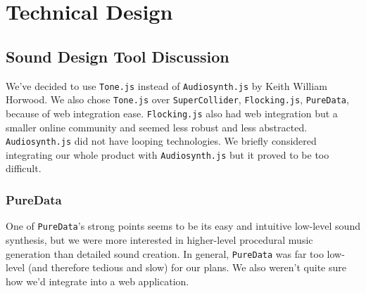 \documentclass[12pt,a4paper]{article}
\newcommand{\lightcode}[1]{\colorbox{light-gray}{\texttt{#1}}}
\begin{document}
\pagebreak
\section{Technical Design}

\subsection{Sound Design Tool Discussion}
We've decided to use \lightcode{Tone.js} instead of \lightcode{Audiosynth.js} by Keith William Horwood. We also chose \lightcode{Tone.js} over \lightcode{SuperCollider}, \lightcode{Flocking.js}, \lightcode{PureData}, because of web integration ease. \lightcode{Flocking.js} also had web integration but a smaller online community and seemed less robust and less abstracted. \lightcode{Audiosynth.js} did not have looping technologies. We briefly considered integrating our whole product with \lightcode{Audiosynth.js} but it proved to be too difficult.

\subsubsection{PureData}
One of \lightcode{PureData}'s strong points seems to be its easy and intuitive low-level sound synthesis, but we were more interested in higher-level procedural music generation than detailed sound creation. In general, \lightcode{PureData} was far too low-level (and therefore tedious and slow) for our plans. We also weren't quite sure how we'd integrate into a web application.
\end{document}

